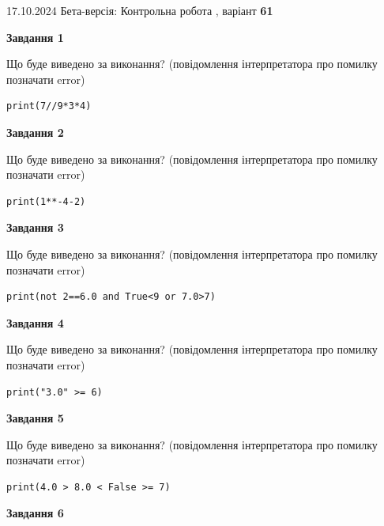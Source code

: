 \documentclass[12pt, ukrainian]{article}
\begin{document}
{\Large{17.10.2024 Бета-версія: Контрольна робота , варіант  \No \textbf { 61 }\par}}
{
\begin {large}
{\begin {center}\textbf{Завдання 1}\end {center}}

Що буде виведено за виконання? (повідомлення інтерпретатора про помилку позначати error)\par
\begin{verbatim}
print(7//9*3*4)
\end{verbatim}

{\begin {center}\textbf{Завдання 2}\end {center}}

Що буде виведено за виконання? (повідомлення інтерпретатора про помилку позначати error)\par
\begin{verbatim}
print(1**-4-2)
\end{verbatim}

{\begin {center}\textbf{Завдання 3}\end {center}}

Що буде виведено за виконання? (повідомлення інтерпретатора про помилку позначати error)\par
\begin{verbatim}
print(not 2==6.0 and True<9 or 7.0>7)
\end{verbatim}

{\begin {center}\textbf{Завдання 4}\end {center}}

Що буде виведено за виконання? (повідомлення інтерпретатора про помилку позначати error)\par
\begin{verbatim}
print("3.0" >= 6)
\end{verbatim}

{\begin {center}\textbf{Завдання 5}\end {center}}

Що буде виведено за виконання? (повідомлення інтерпретатора про помилку позначати error)\par
\begin{verbatim}
print(4.0 > 8.0 < False >= 7)
\end{verbatim}

{\begin {center}\textbf{Завдання 6}\end {center}}


\end{large}}
\end{document}
